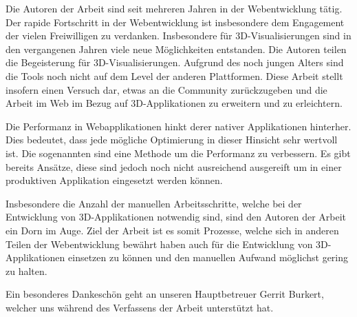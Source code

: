 Die Autoren der Arbeit sind seit mehreren Jahren in der Webentwicklung tätig. Der rapide Fortschritt in der Webentwicklung ist insbesondere dem Engagement der vielen Freiwilligen zu verdanken.
Insbesondere für 3D-Visualisierungen sind in den vergangenen Jahren viele neue Möglichkeiten entstanden. Die Autoren teilen die Begeisterung für 3D-Visualisierungen. Aufgrund des noch jungen Alters sind die Tools noch nicht auf dem Level der anderen Plattformen. Diese Arbeit stellt insofern einen Versuch dar, etwas an die Community zurückzugeben und die Arbeit im Web im Bezug auf 3D-Applikationen zu erweitern und zu erleichtern.

Die Performanz in Webapplikationen hinkt derer nativer Applikationen hinterher. Dies bedeutet, dass jede mögliche Optimierung in dieser Hinsicht sehr wertvoll ist. Die sogenannten  sind eine Methode um die Performanz zu verbessern. Es gibt bereits Ansätze, diese sind jedoch noch nicht ausreichend ausgereift um in einer produktiven Applikation eingesetzt werden können.

Insbesondere die Anzahl der manuellen Arbeitsschritte, welche bei der Entwicklung von 3D-Applikationen notwendig sind, sind den Autoren der Arbeit ein Dorn im Auge. Ziel der Arbeit ist es somit Prozesse, welche sich in anderen Teilen der Webentwicklung bewährt haben auch für die Entwicklung von 3D-Applikationen einsetzen zu können und den manuellen Aufwand möglichst gering zu halten.

Ein besonderes Dankeschön geht an unseren Hauptbetreuer Gerrit Burkert, welcher uns während des Verfassens der Arbeit unterstützt hat.